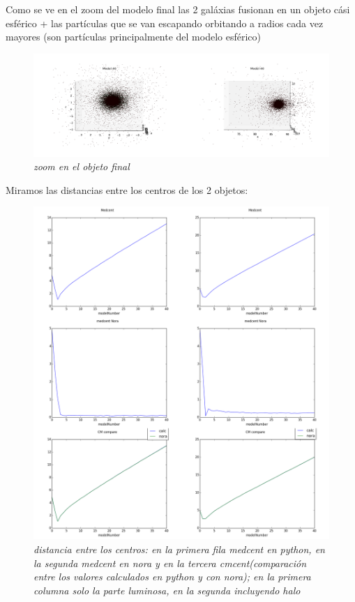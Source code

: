 \documentclass[12pt]{article} %
\renewcommand{\=}[1]{\stackrel{#1}{=}} %
\theoremstyle{definition}
\theoremstyle{remark}
\begin{document}
Como se ve en el zoom del modelo final las 2 galáxias fusionan en un objeto cási esférico + las partículas que se van escapando orbitando a radios cada vez mayores (son partículas principalmente del modelo esférico)
\begin{figure}[!ht]
 \centering
 \includegraphics[scale=0.2]{finzoomsep590deg.png}
 \caption{\emph{zoom en el objeto final}}
\end{figure}

Miramos las distancias entre los centros de los 2 objetos:

\begin{figure}[!ht]
 \centering
 \includegraphics[scale=0.2]{sep5Centerdist.png}
 \caption{\emph{ distancia entre los centros: en la primera fila medcent en python, en la  segunda  medcent en nora y en la tercera cmcent(comparación entre los valores calculados en python y con nora); en la primera columna solo la parte luminosa, en la segunda incluyendo halo }}
\end{figure}
\end{document}
